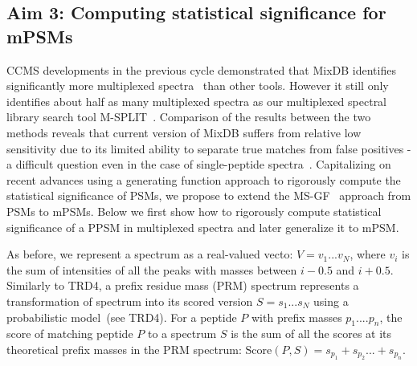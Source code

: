\documentclass[arial,11pt]{article}
\begin{document}

\subsection{Aim 3: Computing statistical significance for mPSMs}

CCMS developments in the previous cycle demonstrated that MixDB
 identifies  significantly more multiplexed spectra~\cite{wang2011peptide} than other tools.  However it still only identifies about half as many multiplexed spectra as our multiplexed spectral library search tool M-SPLIT~\cite{wang2010msplit}. Comparison of the results between the two methods reveals that current version of MixDB suffers from relative low sensitivity due to its limited ability to separate true matches from false positives \-- a difficult question even in the case of single-peptide spectra~\cite{kall2007semi,kim2008spectral,nesvizhskii2010,gupta11}.  Capitalizing on recent advances using a generating function approach to rigorously compute the statistical significance of PSMs, we propose to extend the MS-GF~\cite{kim2008spectral} approach from PSMs to mPSMs. Below we first show how to rigorously compute statistical significance of a PPSM in multiplexed spectra and later generalize it to mPSM.


As before, we represent a spectrum as a real-valued vecto: $V = v_{1} ... v_{N}$, where $v_{i}$ is the sum of intensities of all the peaks with masses between $i-0.5$ and $i+0.5$. Similarly to TRD4, a prefix residue mass (PRM) spectrum represents a transformation of  spectrum into its scored version $S = s_{1} ... s_{N}$ using a probabilistic model~\cite{kim2009}(see TRD4).
For a peptide $P$ with prefix masses $p_{1} .... p_{n}$,  the score of matching peptide $P$ to a spectrum $S$ is the sum of all the scores at its theoretical prefix masses in the PRM spectrum: $\text{Score}(P,S) = s_{p_{1}} + s_{p_{2}} ... + s_{p_{n}}$.
\end{document}

